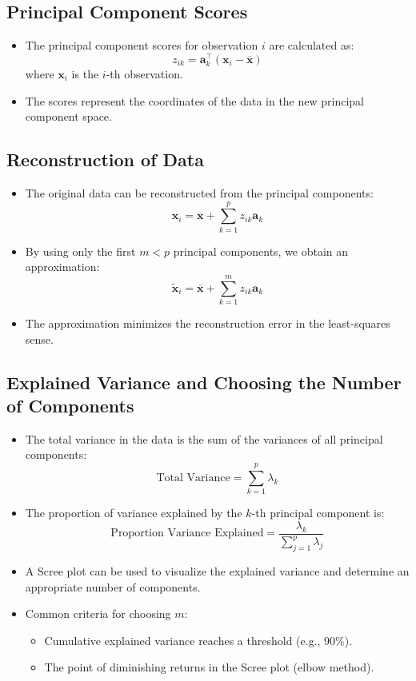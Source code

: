 \documentclass{article}
\begin{document}
\subsection{Principal Component Scores}

\begin{itemize}
    \item The principal component scores for observation $i$ are calculated as:
    \[
    z_{ik} = \mathbf{a}_k^\top (\mathbf{x}_i - \overline{\mathbf{x}})
    \]
    where $\mathbf{x}_i$ is the $i$-th observation.
    \item The scores represent the coordinates of the data in the new principal component space.
\end{itemize}

\subsection{Reconstruction of Data}

\begin{itemize}
    \item The original data can be reconstructed from the principal components:
    \[
    \mathbf{x}_i = \overline{\mathbf{x}} + \sum_{k=1}^p z_{ik} \mathbf{a}_k
    \]
    \item By using only the first $m < p$ principal components, we obtain an approximation:
    \[
    \tilde{\mathbf{x}}_i = \overline{\mathbf{x}} + \sum_{k=1}^m z_{ik} \mathbf{a}_k
    \]
    \item The approximation minimizes the reconstruction error in the least-squares sense.
\end{itemize}

\subsection{Explained Variance and Choosing the Number of Components}

\begin{itemize}
    \item The total variance in the data is the sum of the variances of all principal components:
    \[
    \text{Total Variance} = \sum_{k=1}^p \lambda_k
    \]
    \item The proportion of variance explained by the $k$-th principal component is:
    \[
    \text{Proportion Variance Explained} = \frac{\lambda_k}{\sum_{j=1}^p \lambda_j}
    \]
    \item A Scree plot can be used to visualize the explained variance and determine an appropriate number of components.
    \item Common criteria for choosing $m$:
    \begin{itemize}
        \item Cumulative explained variance reaches a threshold (e.g., 90\%).
        \item The point of diminishing returns in the Scree plot (elbow method).
    \end{itemize}
\end{itemize}
\end{document}
